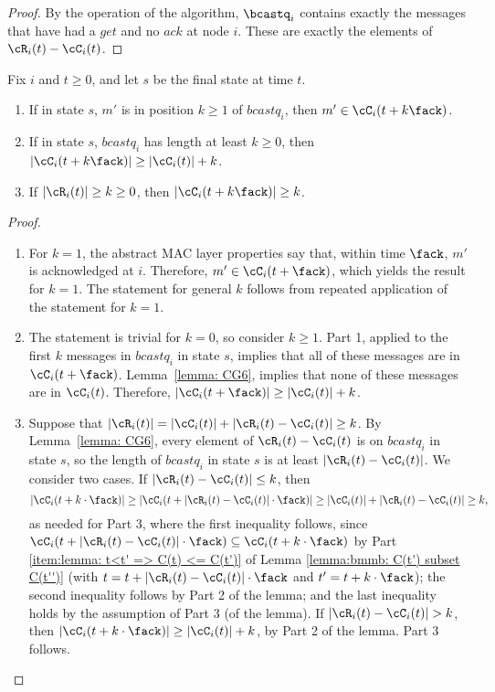 \begin{proof}
By the operation of the algorithm, $\bcastq_i$ contains exactly the
messages that have had a $get$ and no $ack$ at node $i$.
These
are exactly the elements of $\cR_i(t) - \cC_i(t)$.
\end{proof}




\begin{lemma}
\label{lemma:  CG2}
\label{lemma: CG3}
Fix $i$ and $t \geq 0$,
and let $s$ be the final state at time $t$.
\begin{enumerate}
\item
If in state $s$, $m'$ is in position $k\geq 1$ of $bcastq_i$, then $m'
\in \cC_i(t + k \fack)$.
\item
If in state $s$, $bcastq_i$ has length at least $k\geq 0$, then
$|\cC_i(t + k \fack)| \geq |\cC_i(t)| + k$.
\item
If $|\cR_i(t)| \geq k \geq 0$, then $|\cC_i(t + k \fack)| \geq k$.
\end{enumerate}
\end{lemma}

\begin{proof}
\begin{enumerate}
\item
For $k=1$,
the abstract MAC layer properties say that, within
time $\fack$, $m'$ is acknowledged at $i$.
Therefore, $m' \in \cC_i(t + \fack)$, which yields the result for $k=1$.
The statement for general $k$ follows from repeated application of the
statement for $k=1$.
\item
The statement is trivial for $k=0$, so consider $k \geq 1$.
Part 1, applied to the first $k$ messages in $bcastq_i$ in state $s$,
implies that all of these messages are in $\cC_i(t + \fack)$.
Lemma~\ref{lemma: CG6},
implies that none of these messages
are in $\cC_i(t)$.
Therefore, $|\cC_i(t + \fack)| \geq |\cC_i(t)| + k$.
\item
Suppose that  $|\cR_i(t)| = |\cC_i(t)| + |\cR_i(t) - \cC_i(t)| \geq k$.
By Lemma~\ref{lemma: CG6}, every element of $\cR_i(t) - \cC_i(t)$ is on
$bcastq_i$ in state $s$, so the length of $bcastq_i$ in state $s$ is
at least $|\cR_i(t) - \cC_i(t)|$.
We consider two cases. If $|\cR_i(t) - \cC_i(t)|\leq k$, then
$$
|\cC_i(t+k \cdot \fack)| \geq |\cC_i(t+ |\cR_i(t) - \cC_i(t)| \cdot \fack)| \geq |\cC_i(t)|+|\cR_i(t) - \cC_i(t)| \geq k,
$$
as needed for Part 3, where the first inequality follows, since
$\cC_i(t+ |\cR_i(t) - \cC_i(t)|\cdot \fack) \subseteq \cC_i(t+k \cdot \fack) $
by
Part \ref{item:lemma: t<t' => C(t) <= C(t')}
of Lemma \ref{lemma:bmmb: C(t') subset C(t'')}
(with $t= t+ |\cR_i(t) - \cC_i(t)|\cdot \fack$ and $t'=t+k \cdot \fack$);
the second inequality follows by Part 2 of the lemma;
and the last inequality holds by the assumption of Part 3 (of the lemma).
If $|\cR_i(t) - \cC_i(t)| > k$, then
$|\cC_i(t+k \cdot \fack)| \geq |\cC_i(t)|+k$, by Part 2 of the lemma.
Part 3 follows.
\end{enumerate}
\end{proof}


